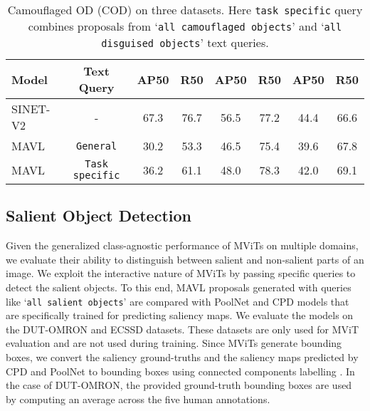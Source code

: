 \documentclass[runningheads]{llncs}
\newcommand{\txt}[1]{{\texttt{#1}}}
\begin{document}
\begin{table}[!t]
\begin{subtable}[t]{0.55\linewidth}
{\begin{tabular}{l *{7}{c}}
          \rowcolor{Gray} Model  & Text Query & AP50 & R50 & AP50 & R50 & AP50 & R50 \\
          \midrule
          SINET-V2 \cite{SINET-V2} & - & 67.3 & 76.7 & 56.5 & 77.2 & 44.4 & 66.6 \\
          \rowcolor{orange!6}
          MAVL & \txt{General} & 30.2	& 53.3	& 46.5	& 75.4 & 39.6 & 67.8 \\
          \rowcolor{orange!6}
          MAVL & \txt{Task specific} & 36.2 & 61.1 & 48.0 & 78.3 & 42.0 & 69.1 \\
          \bottomrule                             
        \end{tabular}
    }
    \caption{Camouflaged OD (COD) on three datasets. Here \txt{task specific} query combines proposals from ‘\txt{all camouflaged objects}' and ‘\txt{all disguised objects}' text queries.}
    \label{table12:cod}
  \end{subtable}
\end{table}

\subsection{Salient Object Detection}
Given the generalized class-agnostic performance of MViTs on multiple domains, we evaluate their ability to distinguish between salient and non-salient parts of an image. We exploit the interactive nature of MViTs by passing specific queries to detect the salient objects. 
To this end, MAVL proposals generated with queries like ‘\txt{all salient objects}' are compared with PoolNet \cite{liu2019simple} and CPD \cite{wu2019cascaded} models that are specifically trained for predicting saliency maps. We evaluate the models on the DUT-OMRON \cite{yang2013saliency} and ECSSD \cite{shi2015hierarchical} datasets. These datasets are only used for MViT evaluation and are not used during training. Since MViTs generate bounding boxes, we convert the saliency ground-truths and the saliency maps predicted by CPD and PoolNet to bounding boxes using connected components labelling \cite{wu2005optimizing}. In the case of DUT-OMRON, the provided ground-truth bounding boxes are used by computing an average across the five human annotations. 
\end{document}

